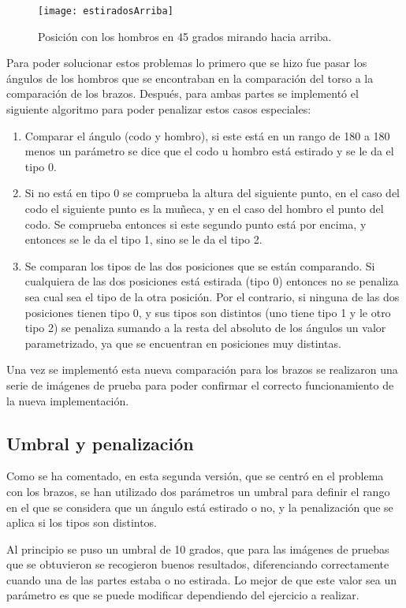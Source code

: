 {\begin{figure}[h]
	\centering
	\texttt{[image: estiradosArriba]}
	\caption{Posición con los hombros en 45 grados mirando hacia arriba.}
	\label{fig:estiradosArriba}
\end{figure}

Para poder solucionar estos problemas lo primero que se hizo fue pasar los ángulos de los hombros que se encontraban en la comparación del torso a la comparación de los brazos. Después, para ambas partes se implementó el siguiente algoritmo para poder penalizar estos casos especiales:
\begin{enumerate}
	\item Comparar el ángulo (codo y hombro), si este está en un rango de 180 a 180 menos un parámetro se dice que el codo u hombro está estirado y se le da el tipo 0.
	\item Si no está en tipo 0 se comprueba la altura del siguiente punto, en el caso del codo el siguiente punto es la muñeca, y en el caso del hombro el punto del codo. Se comprueba entonces si este segundo punto está por encima, y entonces se le da el tipo 1, sino se le da el tipo 2.
	\item Se comparan los tipos de las dos posiciones que se están comparando. Si cualquiera de las dos posiciones está estirada (tipo 0) entonces no se penaliza sea cual sea el tipo de la otra posición. Por el contrario, si ninguna de las dos posiciones tienen tipo 0, y sus tipos son distintos (uno tiene tipo 1 y le otro tipo 2) se penaliza sumando a la resta del absoluto de los ángulos un valor parametrizado, ya que se encuentran en posiciones muy distintas.
\end{enumerate}

Una vez se implementó esta nueva comparación para los brazos se realizaron una serie de imágenes de prueba para poder confirmar el correcto funcionamiento de la nueva implementación.

\subsection{Umbral y penalización}
Como se ha comentado, en esta segunda versión, que se centró en el problema con los brazos, se han utilizado dos parámetros un umbral para definir el rango en el que se considera que un ángulo está estirado o no, y la penalización que se aplica si los tipos son distintos.

Al principio se puso un umbral de 10 grados, que para las imágenes de pruebas que se obtuvieron se recogieron buenos resultados, diferenciando correctamente cuando una de las partes estaba o no estirada. Lo mejor de que este valor sea un parámetro es que se puede modificar dependiendo del ejercicio a realizar.

}
